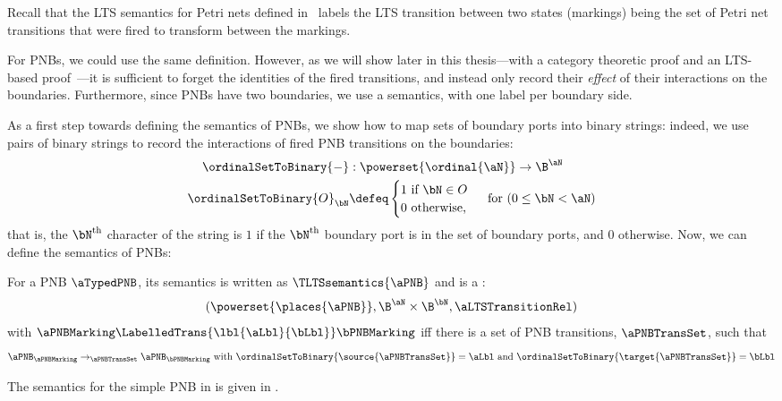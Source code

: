 Recall that the LTS semantics for Petri nets defined
in~ labels the LTS transition between two states
(markings) being the set of Petri net transitions that were fired to transform
between the markings.

For PNBs, we could use the same definition. However, as we will show later in this
thesis---with a category theoretic proof  and an
LTS-based proof~---it is sufficient to forget the
identities of the fired transitions, and instead only record their
\emph{effect} of their interactions on the boundaries. Furthermore, since PNBs
have two boundaries, we use a \TLTS{} semantics, with one label per boundary
side.

As a first step towards defining the \TLTS{} semantics of PNBs, we show how to
map sets of boundary ports into binary strings: indeed, we use pairs of binary
strings to record the interactions of fired PNB transitions on the boundaries:
\begin{align*}
\ordinalSetToBinary{-} &: \powerset{\ordinal{\aN}} \to \B^\aN \\
\ordinalSetToBinary{O}_\bN &\defeq \begin{cases}1 \text{ if } \bN \in O \\
    0 \text { otherwise,} \end{cases} \text{ for } (0 \le \bN < \aN)\\
\end{align*}
that is, the $\bN^{\text{th}}$ character of the string is $1$ if the
$\bN^{\text{th}}$ boundary port is in the set of boundary ports, and $0$
otherwise. Now, we can define the \TLTS{} semantics of PNBs:

\begin{definition}\label{defn:PNBlts}
    For a PNB $\aTypedPNB$, its \TLTS{} semantics is written as
    $\TLTSsemantics{\aPNB}$ and is a \LTSB{\aN}{\bN}:
    \[
        (\powerset{\places{\aPNB}}, \B^\aN \times \B^\bN, \aLTSTransitionRel)
    \]
    with $\aPNBMarking \LabelledTrans{\lbl{\aLbl}{\bLbl}} \bPNBMarking$ iff
    there is a set of PNB transitions, $\aPNBTransSet$, such that
    \[
        \aPNB_\aPNBMarking \to_\aPNBTransSet \aPNB_\bPNBMarking
        \text{ with } \ordinalSetToBinary{\source{\aPNBTransSet}} = \aLbl
        \text{ and } \ordinalSetToBinary{\target{\aPNBTransSet}} = \bLbl
    \]
\end{definition}

\begin{example}\label{ex:LTScomponentB}
    The \TLTS{} semantics for the simple PNB in  is
    given in .
\end{example}

